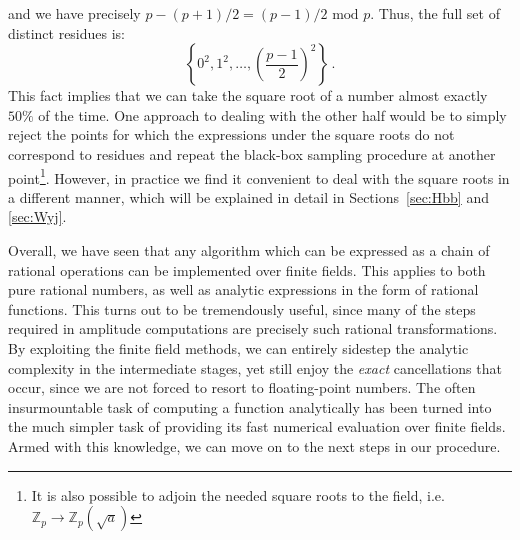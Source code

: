 \documentclass[main.tex]{subfiles}
\begin{document}
and we have precisely $p - (p+1)/2 = (p-1)/2 \text{ mod }p$. Thus, the full set of distinct residues is:
\begin{equation}
    \left\{0^2, 1^2, \ldots, \left(\frac{p-1}{2}\right)^2  \right\}\,.
\end{equation}
This fact implies that we can take the square root of a number almost exactly $50\%$ of the time. One approach to dealing with the other half would be to simply reject the points for which the expressions under the square roots
do not correspond to residues and repeat the black-box sampling procedure at another point\footnote{It is also possible to adjoin the needed square roots to the field, i.e. $\mathbb{Z}_p \rightarrow \mathbb{Z}_p \left( \sqrt{a} \right)$}. However, in practice we find it convenient to deal with the square roots in a different manner, which will be explained in detail in Sections~\ref{sec:Hbb} and \ref{sec:Wyj}.

Overall, we have seen that any algorithm which can be expressed as a chain of rational operations can be implemented over finite fields. This applies to both pure rational numbers, as well as analytic expressions in the form of rational functions. This turns out to be tremendously useful, since many of the steps required in amplitude computations are precisely such rational transformations. By exploiting the finite field methods, we can entirely sidestep the analytic complexity in the intermediate stages, yet still enjoy the \textit{exact} cancellations that occur, since we are not forced to resort to floating-point numbers. The often insurmountable task of computing a function analytically has been turned into the much simpler task of providing its fast numerical evaluation over finite fields. Armed with this knowledge, we can move on to the next steps in our procedure.
\end{document}
